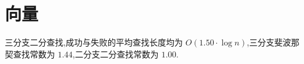 
\usepackage{../../lectures_preamble}


    \section{向量}
    三分支二分查找,成功与失败的平均查找长度均为 $O\left( 1.50\cdot \log n \right) $,三分支斐波那契查找常数为 $1.44$,二分支二分查找常数为 $1.00$.

